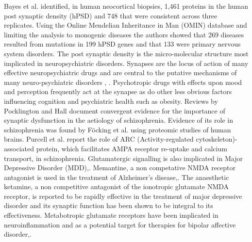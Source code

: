 Bayes et al.\cite{bayes2011characterization} identified, in human neocortical biopsies, 1,461 proteins in the human post synaptic density (hPSD) and 748 that were consistent across three replicates. Using the Online Mendelian Inheritance in Man (OMIN) database \cite{hamosh2005online} and limiting the analysis to monogenic diseases the authors showed that 269 diseases resulted from mutations in 199 hPSD genes and that 133 were primary nervous system disorders. The post synaptic density is the micro-molecular structure most implicated in neuropsychiatric disorders\cite{grant2012synaptopathies}. Synapses are the locus of action of many effective neuropsychiatric drugs and are central to the putative mechanisms of many neuro-psychiatric disorders \cite{thompson2015excitatory}, \cite{hu2015glutamate}. Psychotropic drugs with effects upon mood and perception frequently act at the synapse \cite{korpi2015mechanisms} as do other less obvious factors influencing cognition and psychiatric health such as obesity\cite{bocarsly2015obesity}. Reviews by Pocklington \cite{pocklington2014synapse} and Hall \cite{hall2015genetic} document convergent evidence for the importance of synaptic dysfunction in the aetiology of schizophrenia. 
 Evidence of its role in schizophrenia was found by F{\"o}cking et al.\cite{focking2015proteomic} using proteomic studies of human brains. Purcell et al.\cite{purcell2014polygenic} report the role of ARC (Activity-regulated cytoskeleton)-associated protein, which facilitates AMPA receptor re-uptake and calcium transport, in schizophrenia. 
Glutamatergic signalling is also implicated in Major Depressive Disorder (MDD)\cite{murrough2017targeting},\cite{de2017genetic}. Memantine, a non competative NMDA receptor antagonist is used in the treatment of Alzheimer's disease\cite{mcshane2019memantine},\cite{amin2021bedside}. The anaesthetic ketamine, a non competitive antagonist of the ionotropic glutamate NMDA receptor, is reported to be rapidly effective in the treatment of major depressive disorder and its synaptic function has been shown to be integral to its effectiveness\cite{kavalali2015does}. Metabotropic glutamate receptors have been implicated in neuroinflammation and as a potential target for therapies for bipolar affective disorder\cite{fazio2018targeting},\cite{king2019inflammation}.

